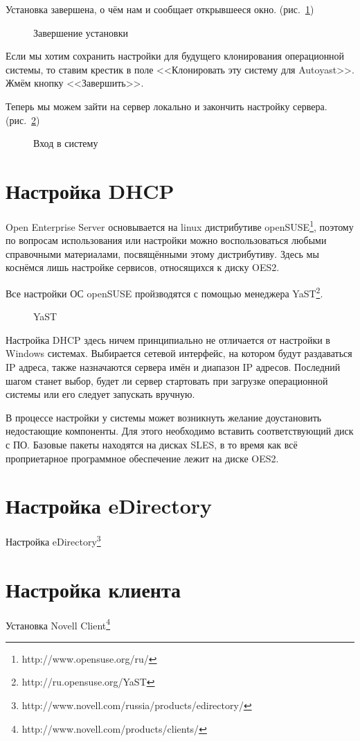 Установка завершена, о чём нам и сообщает открывшееся окно. (рис.~\ref{fig15})
\begin{figure}[H]
\caption{Завершение установки}
\label{fig15}
\end{figure}
Если мы хотим сохранить настройки для будущего клонирования операционной
системы, то ставим крестик в поле <<Клонировать эту систему для Autoyast>>. Жмём кнопку <<Завершить>>.
\clearpage

Теперь мы можем зайти на сервер локально и закончить настройку сервера. (рис.~\ref{fig16})
\begin{figure}[H]
\caption{Вход в систему}
\label{fig16}
\end{figure}
\clearpage

\section{Настройка DHCP}
Open Enterprise Server основывается на linux дистрибутиве openSUSE\footnote{http://www.opensuse.org/ru/}, поэтому по вопросам использования или настройки можно воспользоваться любыми справочными материалами, посвящёнными этому дистрибутиву. Здесь мы коснёмся лишь настройке сервисов, относящихся к диску OES2.\par 
Все настройки ОС openSUSE пройзводятся с помощью менеджера YaST\footnote{http://ru.opensuse.org/YaST}.
\begin{figure}[H]
\caption{YaST}
\label{yast}
\end{figure}
Настройка DHCP здесь ничем принципиально не отличается от настройки в Windows системах. Выбирается сетевой интерфейс, на котором будут раздаваться IP адреса, также назначаются сервера имён и диапазон IP адресов. Последний шагом станет выбор, будет ли сервер стартовать при загрузке операционной системы или его следует запускать вручную.\par
В процессе настройки у системы может возникнуть желание доустановить недостающие компоненты. Для этого необходимо вставить соответствующий диск с ПО. Базовые пакеты находятся на дисках SLES, в то время как всё проприетарное программное обеспечение лежит на диске OES2.

\section{Настройка eDirectory}
Настройка eDirectory\footnote{http://www.novell.com/russia/products/edirectory/}

\section{Настройка клиента}
Установка Novell Client\footnote{http://www.novell.com/products/clients/}